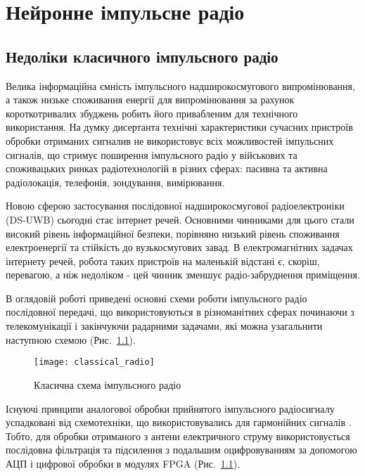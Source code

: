 \chapter{Нейронне імпульсне радіо}
\label{ch:neuron}

\section{Недоліки класичного імпульсного радіо}

Велика інформаційна ємність імпульсного надширокосмугового випромінювання, 
а також низьке споживання енергії для випромінювання за рахунок 
короткотривалих збуджень робить його привабленим для технічного використання.
На думку дисертанта технічні характеристики сучасних пристроїв обробки 
отриманих сигналив не використовує всіх можливостей імпульсних сигналів, що 
стримує поширення імпульсного радіо у військових та споживацьких ринках
радіотехнологій в різних сферах: пасивна та активна радіолокація, телефонія, 
зондування, вимірювання.

Новою сферою застосування послідовної надширокосмугової радіоелектроніки 
(DS-UWB) сьогодні стає інтернет речей. Основними чинниками для цього стали 
високий рівень інформаційної безпеки, порівняно низький рівень споживання 
електроенергії та стійкість до вузькосмугових завад. В електромагнітних 
задачах інтернету речей, робота таких пристроїв на маленькій відстані є, 
скоріш, перевагою, а ніж недоліком - цей чинник зменшує радіо-забруднення 
приміщення.

В оглядовій роботі \cite{imp:ChannelImplementation} приведені основні схеми
роботи імпульсного радіо послідовної передачі, що використовуються в 
різноманітних сферах починаючи з телекомунікації і закінчуючи радарними 
задачами, які можна узагальнити наступною схемою (Рис.~\ref{fig:emp_radio}).

\begin{figure}[htbp] \begin{center}
\texttt{[image: classical\_radio]}
\caption{Класична схема імпульсного радіо} \label{fig:emp_radio}
\end{center} \end{figure}

Існуючі принципи аналогової обробки прийнятого імпульсного радіосигналу 
успадковані від схемотехніки, що використовувались для гармонійних сигналів 
\cite{imp:ComunicationsOverview}. Тобто, для обробки отриманого з антени 
електричного струму використовується послідовна фільтрація та підсилення з 
подальшим оцифровуванням за допомогою АЦП і цифрової обробки в модулях FPGA 
(Рис.~\ref{fig:emp_radio}).

